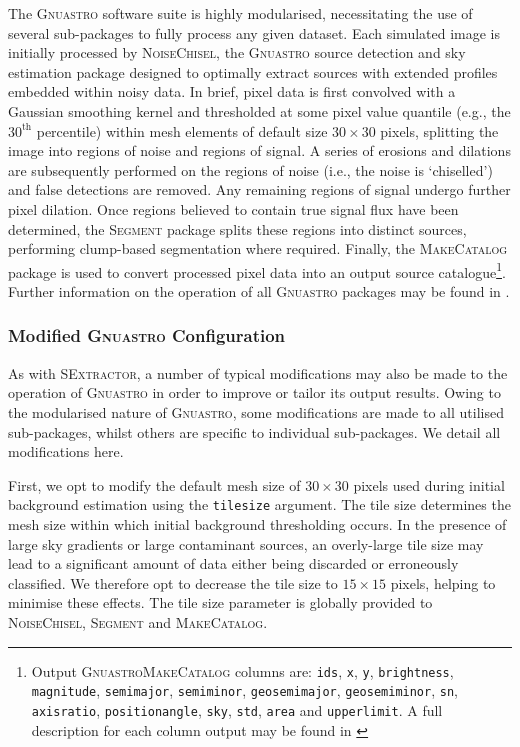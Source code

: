 \documentclass[fleqn,usenatbib,useAMS]{mnras}
\newcommand*{\SExtractor}{\textsc{SExtractor}\xspace}
\newcommand*{\Gnuastro}{\textsc{Gnuastro}\xspace}
\newcommand*{\NoiseChisel}{\textsc{NoiseChisel}\xspace}
\newcommand*{\Segment}{\textsc{Segment}\xspace}
\newcommand*{\MakeCatalog}{\textsc{MakeCatalog}\xspace}
\begin{document}
The \Gnuastro software suite is highly modularised, necessitating the use of several sub-packages to fully process any given dataset. Each simulated image is initially processed by \NoiseChisel, the \Gnuastro source detection and sky estimation package designed to optimally extract sources with extended profiles embedded within noisy data. In brief, pixel data is first convolved with a Gaussian smoothing kernel and thresholded at some pixel value quantile (e.g., the $30^{\mathrm{th}}$ percentile) within mesh elements of default size $30\times30$ pixels, splitting the image into regions of noise and regions of signal. A series of erosions and dilations are subsequently performed on the regions of noise (i.e., the noise is `chiselled') and false detections are removed. Any remaining regions of signal undergo further pixel dilation. Once regions believed to contain true signal flux have been determined, the \Segment package splits these regions into distinct sources, performing clump-based segmentation where required. Finally, the \MakeCatalog package is used to convert processed pixel data into an output source catalogue\footnote{Output \Gnuastro \MakeCatalog columns are: \texttt{ids}, \texttt{x}, \texttt{y}, \texttt{brightness}, \texttt{magnitude}, \texttt{semimajor}, \texttt{semiminor}, \texttt{geosemimajor}, \texttt{geosemiminor}, \texttt{sn}, \texttt{axisratio}, \texttt{positionangle}, \texttt{sky}, \texttt{std}, \texttt{area} and \texttt{upperlimit}. A full description for each column output may be found in \citet{Akhlaghi2015}}. Further information on the operation of all \Gnuastro packages may be found in \citet{Akhlaghi2015}.

\subsubsection{Modified \Gnuastro Configuration}
\label{sec:gnuastromodified}

As with \SExtractor, a number of typical modifications may also be made to the operation of \Gnuastro in order to improve or tailor its output results. Owing to the modularised nature of \Gnuastro, some modifications are made to all utilised sub-packages, whilst others are specific to individual sub-packages. We detail all modifications here. 

First, we opt to modify the default mesh size of $30\times30$ pixels used during initial background estimation using the \texttt{tilesize} argument. The tile size determines the mesh size within which initial background thresholding occurs. In the presence of large sky gradients or large contaminant sources, an overly-large tile size may lead to a significant amount of data either being discarded or erroneously classified. We therefore opt to decrease the tile size to $15\times15$ pixels, helping to minimise these effects. The tile size parameter is globally provided to \NoiseChisel, \Segment and \MakeCatalog.
\end{document}
